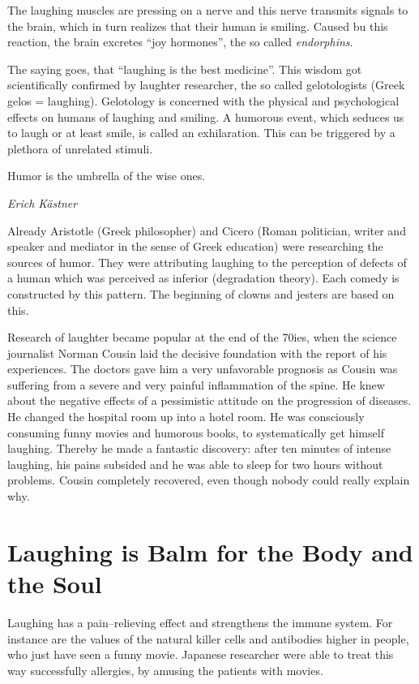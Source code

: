 \documentclass[../main.tex]{subfiles}
\begin{document}
The laughing muscles are pressing on a nerve and this nerve transmits signals to the brain, which in turn realizes that their human is smiling.
Caused bu this reaction, the brain excretes ``joy hormones'', the so called \emph{endorphins}.

The saying goes, that ``laughing is the best medicine''.
This wisdom got scientifically confirmed by laughter researcher, the so called gelotologists (Greek gelos = laughing).
Gelotology is concerned with the physical and psychological effects on humans of laughing and smiling.
A humorous event, which seduces us to laugh or at least smile, is called an exhilaration.
This can be triggered by a plethora of unrelated stimuli.

\epigraph{Humor is the umbrella of the wise ones.}{\textit{Erich K\"astner}}

Already Aristotle (Greek philosopher) and Cicero
(Roman politician, writer and speaker and mediator in the sense of Greek education) were researching the sources of humor.
They were attributing laughing to the perception of defects of a human which was perceived as inferior (degradation theory).
Each comedy is constructed by this pattern.
The beginning of clowns and jesters are based on this.

Research of laughter became popular at the end of the 70ies, when the science journalist Norman Cousin laid the decisive foundation with the report of his experiences.
The doctors gave him a very unfavorable prognosis as Cousin was suffering from a severe and very painful inflammation of the spine.
He  knew about the negative effects of a pessimistic attitude on the progression of diseases.
He changed the hospital room up into a hotel room.
He was consciously consuming funny movies and humorous books, to systematically get himself laughing.
Thereby he made a fantastic discovery: after ten minutes of intense laughing, his pains subsided and he was able to sleep for two hours without problems.
Cousin completely recovered, even though nobody could really explain why.

\section{Laughing is Balm for the Body and the Soul}

Laughing has a pain--relieving effect and strengthens the immune system.
For instance are the values of the natural killer cells and antibodies higher in people, who just have seen a funny movie.
Japanese researcher were able to treat this way successfully allergies, by amusing the patients with movies.
\end{document}
